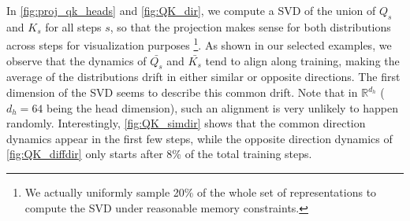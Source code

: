 In \autoref{fig:proj_qk_heads} and \autoref{fig:QK_dir}, we compute a SVD of the union of $Q_s$ and $K_s$ for all steps $s$, so that the projection makes sense for both distributions across steps for visualization purposes \footnote{We actually uniformly sample 20\% of the whole set of representations to compute the SVD under reasonable memory constraints.}. As shown in our selected examples, we observe that the dynamics of $\bar{Q_s}$ and $\bar{K_s}$ tend to align along training, making the average of the distributions drift in either similar or opposite directions. The first dimension of the SVD seems to describe this common drift. Note that in $\mathbb{R}^{d_h}$ ($d_h = 64$ being the head dimension), such an alignment is very unlikely to happen randomly. Interestingly, \autoref{fig:QK_simdir} shows that the common direction dynamics appear in the first few steps, while the opposite direction dynamics of  \autoref{fig:QK_diffdir} only starts after 8\% of the total training steps.

